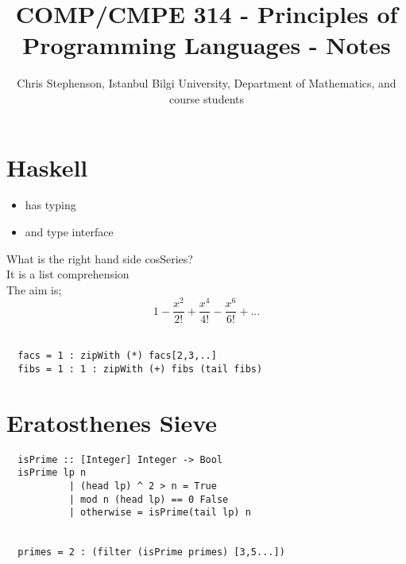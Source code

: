 \documentclass{article}
\begin{document}
\title{COMP/CMPE 314 - Principles of Programming Languages - Notes}
\author{Chris Stephenson, Istanbul Bilgi University, Department of Mathematics, and course students}
\maketitle

\section*{Haskell}
\begin{flushleft}
 \begin{itemize}
  \item has typing
  \item and type interface
 \end{itemize}
 What is the right hand side cosSeries?\\
 It is a list comprehension\\
 \bigskip
 The aim is;\\
 $$1 -\frac{x^2}{2!} + \frac{x^4}{4!} - \frac{x^6}{6!} + ...$$\\
 \begin{verbatim}
  facs = 1 : zipWith (*) facs[2,3,..]
  fibs = 1 : 1 : zipWith (+) fibs (tail fibs)
 \end{verbatim}
\end{flushleft}

\section*{Eratosthenes Sieve}
\begin{flushleft}
 \begin{verbatim}
  isPrime :: [Integer] Integer -> Bool
  isPrime lp n 
           | (head lp) ^ 2 > n = True
           | mod n (head lp) == 0 False
           | otherwise = isPrime(tail lp) n
 
  
  primes = 2 : (filter (isPrime primes) [3,5...])
 \end{verbatim}
\end{flushleft}
\end{document}
